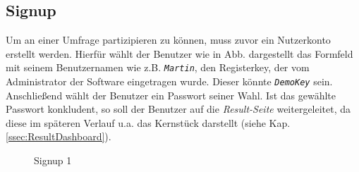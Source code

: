 \subsection{Signup}
\label{ssec:Signup}
Um an einer Umfrage partizipieren zu können, muss zuvor ein Nutzerkonto erstellt werden. 
Hierfür wählt der Benutzer wie in Abb.  dargestellt das Formfeld mit seinem Benutzernamen wie z.B. \emph{\texttt{Martin}}, den Registerkey, der vom Administrator der Software eingetragen wurde. Dieser könnte \emph{\texttt{DemoKey}} sein.
Anschließend wählt der Benutzer ein Passwort seiner Wahl. 
Ist das gewählte Passwort konkludent, so soll der Benutzer auf die \emph{Result-Seite} weitergeleitet, da diese im späteren Verlauf u.a. das Kernstück darstellt (siehe Kap. \vref{ssec:ResultDashboard}). 

\begin{figure}
	\caption[Signup 1]{Signup 1 \\ \quelle}
	\label{fig:MockSignup}
\end{figure}
